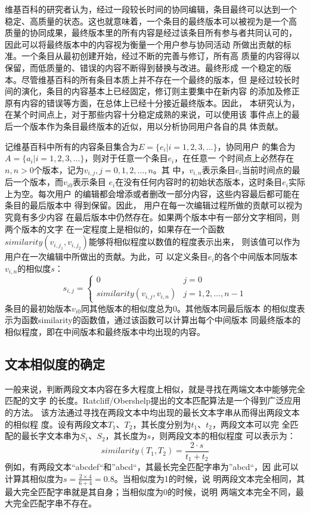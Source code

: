 维基百科的研究者认为，经过一段较长时间的协同编辑，条目最终可以达到一个
稳定、高质量的状态。这也就意味着，一个条目的最终版本可以被视为是一个高
质量的协同成果，最终版本里的所有内容是经过该条目所有参与者共同认可的，
因此可以将最终版本中的内容视为衡量一个用户参与协同活动
所做出贡献的标准。一个条目从最初创建开始，经过不断的完善与修订，所有高
质量的内容得以保留，而低质量的、错误的内容不断得到替换与改进。最终形成
一个稳定的版本。尽管维基百科的所有条目本质上并不存在一个最终的版本，但
是经过较长时间的演化，条目的内容基本上已经固定，修订则主要集中在新内容
的添加及修正原有内容的错误等方面，在总体上已经十分接近最终版本。因此，
本研究认为，在某个时间点上，对于那些内容十分稳定成熟的来说，可以使用该
事件点上的最后一个版本作为条目最终版本的近似，用以分析协同用户各自的具
体贡献。

记维基百科中所有的内容条目集合为$E=\{e_i|i=1,2,3,\ldots \}$，协同用户
的集合为$A=\{a_i|i=1,2,3,\ldots \}$，则对于任意一个条目$e_i$，在任意一
个时间点上必然存在$n, n>0$个版本，记为$v_{i,j} , j=0,1,2,\ldots,n$。其
中，$v_{i,n}$表示条目$e_i$当前时间点的最后一个版本，而$v_{i0}$表示条目
$e_i$在没有任何内容时的初始状态版本，这时条目$e_i$实际上为空。每次用户
的编辑都会增添或者删改一部分内容，这些内容最后都可能在条目的最后版本中
得到保留。因此， 用户在每一次编辑过程所做的贡献可以视为究竟有多少内容
在最后版本中仍然存在。如果两个版本中有一部分文字相同，则两个版本的文字
在一定程度上是相似的，如果存在一个函数
$similarity(v_{i,j_1},v_{i,j_2})$能够将相似程度以数值的程度表示出来，
则该值可以作为用户在一次编辑中所做出的贡献。为此，可
以定义条目$e_i$的各个中间版本同版本$v_{i,n}$的相似度$s$：
\[
s_{i,j}=
\left\{
  \begin{array}{ll}
   0&j=0\\
   similarity(v_{i,j},v_{i,n})&j=1,2,\ldots,n-1 
  \end{array}
  \right.
\]
条目的最初始版本$v_{i0}$同其他版本的相似度总为$0$。其他版本同最后版本
的相似度表示为函数similarity的函数值，通过该函数可以计算出每个中间版本
同最终版本的相似程度，即在中间版本和最终版本中均出现的内容。

\subsection{文本相似度的确定}
\label{sec:similarity}
一般来说，判断两段文本内容在多大程度上相似，就是寻找在两端文本中能够完全匹配的文字
的长度。Ratcliff/Obershelp提出的文本匹配算法是一个得到广泛应用的方法。
该方法通过寻找在两段文本中均出现的最长文本字串从而得出两段文本的相似程
度。设有两段文本$T_1$、$T_2$，其长度分别为$t_1$、$t_2$，两段文本可以完
全匹配的最长字文本串为$S_1$、$S_2$，其长度为$s$，则两段文本的相似程度
可以表示为：
\[
similarity(T_1,T_2)=\frac{2 \cdot  s}{t_1+t_2}
\]
例如，有两段文本“abcdef“和”abcd“，其最长完全匹配字串为”abcd“，因
此可以计算其相似度为$s=\frac{2 \times 4}{6+4}=0.8$。当相似度为1的时候，说
明两段文本完全相同，其最大完全匹配字串就是其自身；当相似度为0的时候，说明
两端文本完全不同，最大完全匹配字串不存在。

